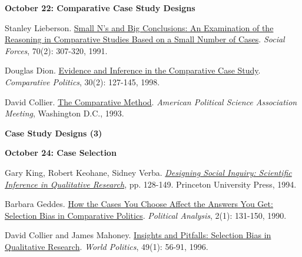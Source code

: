 \documentclass[letterpaper]{article}
\renewenvironment{itemize}{
  \begin{list}{}{
    \setlength{\leftmargin}{1.5em}
  }
}{
  \end{list}
}
\begin{document}
\begin{enumerate}
		\begin{itemize}
		\item {\bf October 22: Comparative Case Study Designs}
			\begin{itemize}
				\item[$\bullet$] Stanley Lieberson. \href{http://www.jstor.org/stable/2580241}{Small N's and Big Conclusions: An Examination of the Reasoning in Comparative Studies Based on a Small Number of Cases}. \emph{Social Forces}, 70(2): 307-320, 1991. 
				\item[$\bullet$] Douglas Dion. \href{http://www.jstor.org/stable/422284}{Evidence and Inference in the Comparative Case Study}. \emph{Comparative Politics}, 30(2): 127-145, 1998.  %
				\item[$\bullet$] David Collier. \href{http://polisci.berkeley.edu/sites/default/files/people/u3827/APSA-TheComparativeMethod.pdf}{The Comparative Method}. \emph{American Political Science Association Meeting}, Washington D.C., 1993.
			\end{itemize}
		\end{itemize}


\item {\bf Case Study Designs (3)}

		\begin{itemize}
		\item {\bf October 24: Case Selection}
			\begin{itemize}
			\item[$\bullet$] Gary King, Robert Keohane, Sidney Verba. \href{https://sites.duke.edu/niou/files/2014/06/king94book.pdf}{\emph{Designing Social Inquiry: Scientific Inference in Qualitative Research}}, pp. 128-149. Princeton University Press, 1994.
			\item[$\bullet$] Barbara Geddes. \href{https://doi.org/10.1093/pan/2.1.131}{How the Cases You Choose Affect the Answers You Get: Selection Bias in Comparative Politics}. \emph{Political Analysis}, 2(1): 131-150, 1990.
			\item[$\bullet$] David Collier and James Mahoney. \href{http://www.jstor.org/stable/25053989}{Insights and Pitfalls: Selection Bias in Qualitative Research}. \emph{World Politics}, 49(1): 56-91, 1996. 

			\end{itemize}
		\end{itemize}


\end{enumerate}
\end{document}
